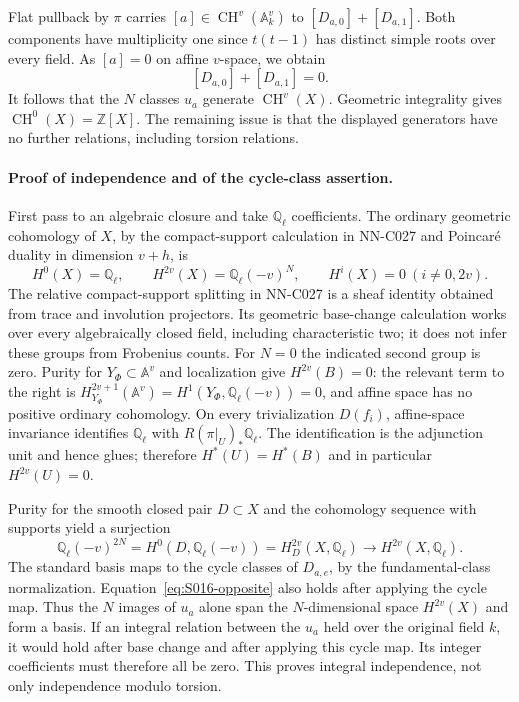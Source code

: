 Flat pullback by $\pi$ carries $[a]\in\operatorname{CH}^v(\mathbb A^v_k)$
to $[D_{a,0}]+[D_{a,1}]$. Both components have multiplicity one since
$t(t-1)$ has distinct simple roots over every field. As $[a]=0$ on
affine $v$-space, we obtain
\begin{equation}\label{eq:S016-opposite}
                     [D_{a,0}]+[D_{a,1}]=0.
\end{equation}
It follows that the $N$ classes $u_a$ generate $\operatorname{CH}^v(X)$.
Geometric integrality gives $\operatorname{CH}^0(X)=\mathbb Z[X]$.
The remaining issue is that the displayed generators have no further
relations, including torsion relations.

\paragraph{Proof of independence and of the cycle-class assertion.}
First pass to an algebraic closure and take $\mathbb Q_\ell$ coefficients.
The ordinary geometric cohomology of $X$, by the compact-support
calculation in NN-C027 and Poincar\'e duality in dimension $v+h$, is
\[
 H^0(X)=\mathbb Q_\ell,\qquad
 H^{2v}(X)=\mathbb Q_\ell(-v)^N,
 \qquad H^i(X)=0\ (i\ne0,2v).
\]
The relative compact-support splitting in NN-C027 is a sheaf identity
obtained from trace and involution projectors. Its geometric base-change
calculation works over every algebraically closed field, including
characteristic two; it does not infer these groups from Frobenius counts.
For $N=0$ the indicated second group is zero. Purity for
$Y_\Phi\subset\mathbb A^v$ and localization give
$H^{2v}(B)=0$: the relevant term to the right is
$H^{2v+1}_{Y_\Phi}(\mathbb A^v)=H^1(Y_\Phi,\mathbb Q_\ell(-v))=0$,
and affine space has no positive ordinary cohomology. On every
trivialization $D(f_i)$, affine-space invariance identifies
$\mathbb Q_\ell$ with $R(\pi|_U)_*\mathbb Q_\ell$.
The identification is the adjunction unit and hence glues; therefore
$H^*(U)=H^*(B)$ and in particular $H^{2v}(U)=0$.

Purity for the smooth closed pair $D\subset X$ and the cohomology
sequence with supports yield a surjection
\[
 \mathbb Q_\ell(-v)^{2N}=H^0(D,\mathbb Q_\ell(-v))
    =H_D^{2v}(X,\mathbb Q_\ell)
       \longrightarrow H^{2v}(X,\mathbb Q_\ell).
\]
The standard basis maps to the cycle classes of $D_{a,e}$, by the
fundamental-class normalization. Equation~\eqref{eq:S016-opposite}
also holds after applying the cycle map. Thus the $N$ images of
$u_a$ alone span the $N$-dimensional space $H^{2v}(X)$ and form a basis.
If an integral relation between the $u_a$ held over the original field
$k$, it would hold after base change and after applying this cycle map.
Its integer coefficients must therefore all be zero. This proves
integral independence, not only independence modulo torsion.

